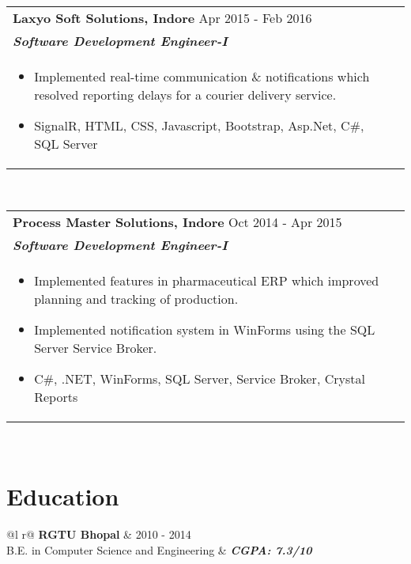 \documentclass[a4paper,20pt]{article}
\begin{document}
\begin{tabularx}{\linewidth}{ @{}l r@{} }
    \color[HTML]{1C033C} \textbf{Laxyo Soft Solutions, Indore} \hfill \color[HTML]{371e77} Apr 2015 - Feb 2016 \\[4pt]
    \color[HTML]{371e77}\textbf{\textit{Software Development Engineer-I}} \hfill \color[HTML]{4B28A4}          \\[5pt]
    \begin{minipage}[t]{\linewidth}
        \begin{itemize}[nosep,after=\strut, leftmargin=2em, itemsep=2pt]
            \item Implemented real-time communication \& notifications which resolved reporting delays for a courier delivery service.
            \item SignalR, HTML, CSS, Javascript, Bootstrap, Asp.Net, C\#, SQL Server
        \end{itemize}
    \end{minipage}
\end{tabularx}\\[3pt]

\begin{tabularx}{\linewidth}{ @{}l r@{} }
    \color[HTML]{1C033C} \textbf{Process Master Solutions, Indore} \hfill \color[HTML]{371e77} Oct 2014 - Apr 2015 \\[4pt]
    \color[HTML]{371e77}\textbf{\textit{Software Development Engineer-I}} \hfill \color[HTML]{4B28A4}              \\[5pt]
    \begin{minipage}[t]{\linewidth}
        \begin{itemize}[nosep,after=\strut, leftmargin=2em, itemsep=2pt]
            \item Implemented features in pharmaceutical ERP which improved planning and tracking of production.
            \item Implemented notification system in WinForms using the SQL Server Service Broker.
            \item C\#, .NET, WinForms, SQL Server, Service Broker, Crystal Reports
        \end{itemize}
    \end{minipage}
\end{tabularx}\\[3pt]

\section{Education}
\begin{tabularx}{\linewidth}{ @{}l r@{} }
    \color[HTML]{1C033C} \textbf{RGTU Bhopal}                     & \hfill \color[HTML]{371e77} 2010 - 2014                    \\
    \color[HTML]{371e77} B.E. in Computer Science and Engineering & \hfill \color[HTML]{4B28A4} \textit{\textbf{CGPA: 7.3/10}} \\
\end{tabularx}\\[3pt]
\end{document}
